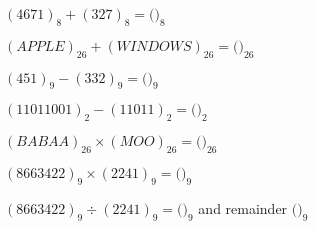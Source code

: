 \documentclass[handout,numbers]{ximera}
\begin{document}
\begin{question} 
	$(4671)_8 + (327)_8 = ($\qquad\qquad {}$)_8$
\end{question}

\begin{question} 
	$(APPLE)_{26}+(WINDOWS)_{26} = ($\qquad\qquad {}$)_{26}$
\end{question}

\begin{question} 
	$(451)_9 - (332)_9 = ($\qquad\qquad {}$)_9$
\end{question}

\begin{question} 
	$(11011001)_2 - (11011)_2 = ($\qquad\qquad {}$)_2$
\end{question}

\begin{question} 
	$(BABAA)_{26}\times (MOO)_{26} = ($\qquad\qquad {}$)_{26}$ 
\end{question}

\begin{question} 
	$(8663422)_9\times (2241)_9 = ($\qquad\qquad {}$)_9$ 
\end{question}

\begin{question}
	$(8663422)_9\div (2241)_9 = ($\qquad\qquad {}$)_9$ and remainder $($\qquad\qquad {}$)_9$
\end{question}
\end{document}
